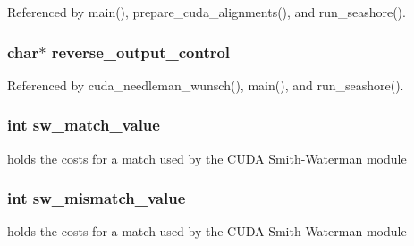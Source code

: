 Referenced by main(), prepare\_\-cuda\_\-alignments(), and run\_\-seashore().
\subsubsection[{reverse\_\-output\_\-control}]{\setlength{\rightskip}{0pt plus 5cm}char$\ast$ {\bf reverse\_\-output\_\-control}}\label{saruman_8h_a587c410cb1f4288b1e9f7baca1cf5e3}




Referenced by cuda\_\-needleman\_\-wunsch(), main(), and run\_\-seashore().
\subsubsection[{sw\_\-match\_\-value}]{\setlength{\rightskip}{0pt plus 5cm}int {\bf sw\_\-match\_\-value}}\label{saruman_8h_1f93bbee2addec9da31597d83b7160c0}


holds the costs for a match used by the CUDA Smith-Waterman module 
\subsubsection[{sw\_\-mismatch\_\-value}]{\setlength{\rightskip}{0pt plus 5cm}int {\bf sw\_\-mismatch\_\-value}}\label{saruman_8h_064ce347753ae0707c1ff0cea06e6366}


holds the costs for a match used by the CUDA Smith-Waterman module 